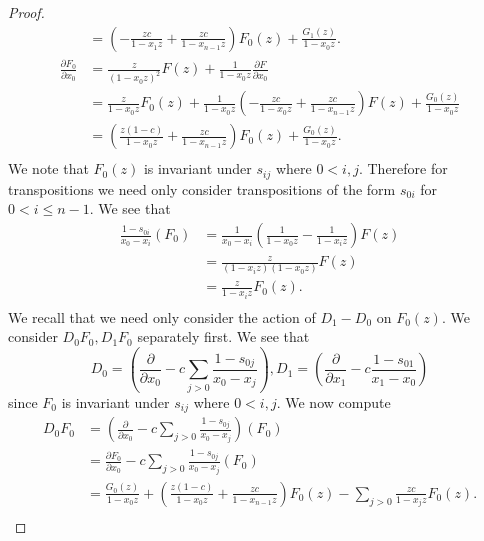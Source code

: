 \documentclass{amsart}
\numberwithin{equation}{section}
\theoremstyle{definition}
\begin{document}
\begin{proof}
\begin{align*}
&=\left(-\frac{zc}{1-x_1z}+\frac{zc}{1-x_{n-1}z}\right)F_0(z)+\frac{G_1(z)}{1-x_0z}.\\
\frac{\partial F_0}{\partial x_0}%
&=\frac{z}{(1-x_0z)^2}F(z)+\frac{1}{1-x_0z}\frac{\partial F}{\partial x_0}\\
&=\frac{z}{1-x_0z}F_0(z)+\frac{1}{1-x_0z}\left(-\frac{zc}{1-x_0z}+\frac{zc}{1-x_{n-1}z}\right)F(z)+\frac{G_0(z)}{1-x_0z}\\
&=\left(\frac{z(1-c)}{1-x_0z}+\frac{zc}{1-x_{n-1}z}\right)F_0(z)+\frac{G_0(z)}{1-x_0z}.\\
\end{align*}
We note that $F_0(z)$ is invariant under $s_{ij}$ where $0 < i,j$. Therefore for transpositions we need only consider transpositions of the form $s_{0i}$ for $0 < i \le n-1$. We see that 
\begin{align*}
\frac{1-s_{0i}}{x_0-x_i}(F_0)%
&=\frac{1}{x_0-x_i}\left(\frac{1}{1-x_0z}-\frac{1}{1-x_iz}\right)F(z)\\
&=\frac{z}{(1-x_iz)(1-x_0z)}F(z)\\
&=\frac{z}{1-x_iz}F_0(z).\\
\end{align*}
We recall that we need only consider the action of $D_1-D_0$ on $F_0(z)$. We consider $D_0F_0, D_1F_0$ separately first. We see that 
\[
D_0=\left(\frac{\partial}{\partial x_0}-c\sum_{j > 0} \frac{1-s_{0j}}{x_0-x_j}\right), D_1=\left(\frac{\partial}{\partial x_1}-c \frac{1-s_{01}}{x_1-x_0}\right)
\]
since $F_0$ is invariant under $s_{ij}$ where $0 < i,j$. We now compute
\begin{align*}
D_0F_0&=\left(\frac{\partial}{\partial x_0}-c\sum_{j > 0} \frac{1-s_{0j}}{x_0-x_j}\right)(F_0)\\
&=\frac{\partial F_0}{\partial x_0}-c\sum_{j > 0} \frac{1-s_{0j}}{x_0-x_j}(F_0)\\
&=\frac{G_0(z)}{1-x_0z}+\left(\frac{z(1-c)}{1-x_0z}+\frac{zc}{1-x_{n-1}z}\right)F_0(z)-\sum_{j > 0} \frac{zc}{1-x_jz}F_0(z).\\

\end{align*}
\end{proof}
\end{document}
